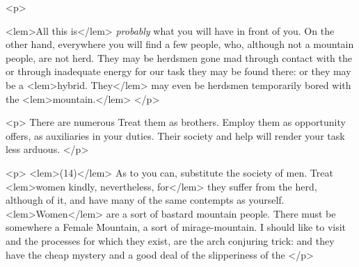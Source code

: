 {{				<p>
				
<lem>All this is</lem>{%
					}
 				\emph{probably} what you will have in front of you. On the other hand, everywhere you 
				will find a few people, who, although not a mountain people, are not herd. They may be 
				herdsmen gone mad through contact with the  
					{}
				or through inadequate energy for our task they may be found there: or they may be 
				a 
<lem>hybrid. They</lem> 
					{}
				may even be herdsmen temporarily bored with the 
<lem>mountain.</lem> 
					{}
				</p> 

				<p>
				There are numerous  
					{}
				Treat them as brothers. Employ them as opportunity offers, as 
				auxiliaries in your duties. Their society and help will render your task less arduous. 
				</p> 

				<p>
				\vspace{10pt}
				\noindent
<lem>(14)</lem>{}\hspace{20pt} As to  
					{}
				you can, substitute the society of men. Treat 
<lem>women kindly, nevertheless, for</lem> 
					{}
				they suffer from the herd, although of it, and have many of the same contempts 
				as yourself. 
<lem>Women</lem> 
					{}
				are a sort of bastard mountain people. There must be somewhere 
				a Female Mountain, a sort of mirage-mountain. I should like to visit  
					{}
				and the processes for which they exist, are the arch conjuring trick: and they 
				have the cheap mystery and a good deal of the slipperiness of the 
					{}
 				</p> 

}}
